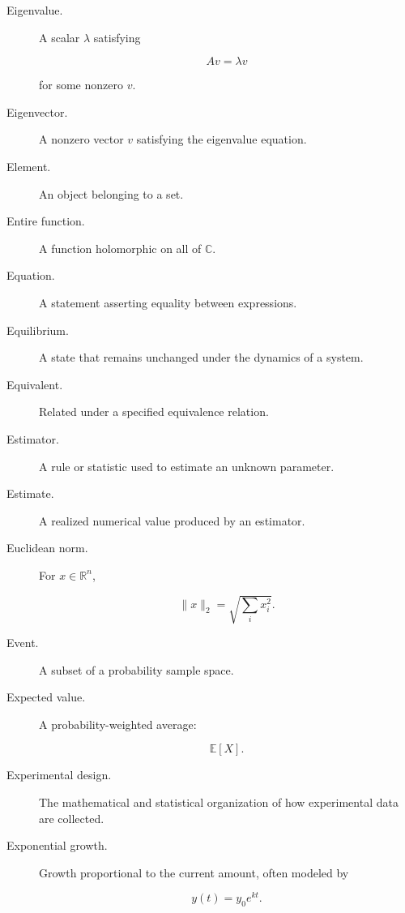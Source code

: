 \begin{description}

\item[Eigenvalue.]
A scalar \(\lambda\) satisfying

\[
Av=\lambda v
\]

for some nonzero \(v\).

\item[Eigenvector.]
A nonzero vector \(v\) satisfying the eigenvalue equation.

\item[Element.]
An object belonging to a set.

\item[Entire function.]
A function holomorphic on all of \(\mathbb{C}\).

\item[Equation.]
A statement asserting equality between expressions.

\item[Equilibrium.]
A state that remains unchanged under the dynamics of a system.

\item[Equivalent.]
Related under a specified equivalence relation.

\item[Estimator.]
A rule or statistic used to estimate an unknown parameter.

\item[Estimate.]
A realized numerical value produced by an estimator.

\item[Euclidean norm.]
For \(x\in\mathbb{R}^n\),

\[
\|x\|_2
=
\sqrt{
\sum_i x_i^2
}.
\]

\item[Event.]
A subset of a probability sample space.

\item[Expected value.]
A probability-weighted average:

\[
\mathbb{E}[X].
\]

\item[Experimental design.]
The mathematical and statistical organization of how experimental data are
collected.

\item[Exponential growth.]
Growth proportional to the current amount, often modeled by

\[
y(t)=y_0e^{kt}.
\]

\end{description}

